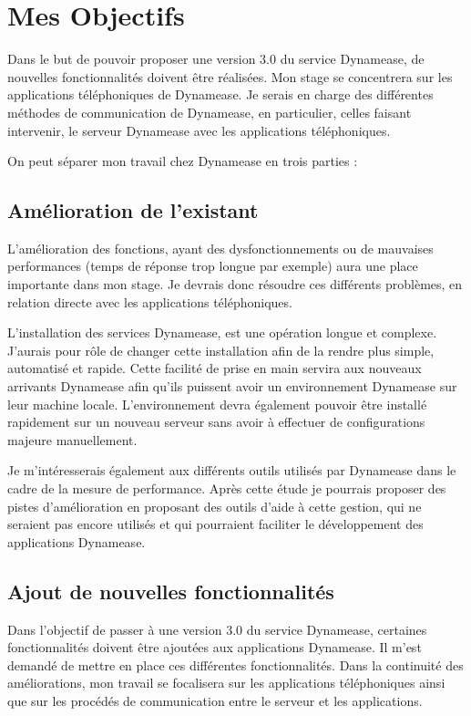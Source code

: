 \section{Mes Objectifs}

 Dans le but de pouvoir proposer une version 3.0 du service Dynamease, de nouvelles fonctionnalités doivent être réalisées. Mon stage se concentrera sur les applications téléphoniques de Dynamease. Je serais en charge des différentes méthodes de communication de Dynamease, en particulier, celles faisant intervenir, le serveur Dynamease avec les applications téléphoniques.

On peut séparer mon travail chez Dynamease en trois parties :

\subsection{Amélioration de l'existant}

L'amélioration des fonctions, ayant des dysfonctionnements ou de mauvaises performances (temps de réponse trop longue par exemple) aura une place importante dans mon stage. Je devrais donc résoudre ces différents problèmes, en relation directe avec les applications téléphoniques.

L'installation des services Dynamease, est une opération longue et complexe. J'aurais pour rôle de changer cette installation afin de la rendre plus simple, automatisé et rapide. Cette facilité de prise en main servira aux nouveaux arrivants Dynamease afin qu'ils puissent avoir un environnement Dynamease sur leur machine locale. L'environnement devra également pouvoir être installé rapidement sur un nouveau serveur sans avoir à effectuer de configurations majeure manuellement.

Je m’intéresserais également aux différents outils utilisés par Dynamease dans le cadre de la mesure de performance. Après cette étude je pourrais proposer des pistes d'amélioration en proposant des outils d'aide à cette gestion, qui ne seraient pas encore utilisés et qui pourraient faciliter le développement des applications Dynamease.


\subsection{Ajout de nouvelles fonctionnalités}

Dans l'objectif de passer à une version 3.0 du service Dynamease, certaines fonctionnalités doivent être ajoutées aux applications Dynamease. Il m'est demandé de mettre en place ces différentes fonctionnalités. Dans la continuité des améliorations, mon travail se focalisera sur les applications téléphoniques ainsi que sur les procédés de communication entre le serveur et les applications.

